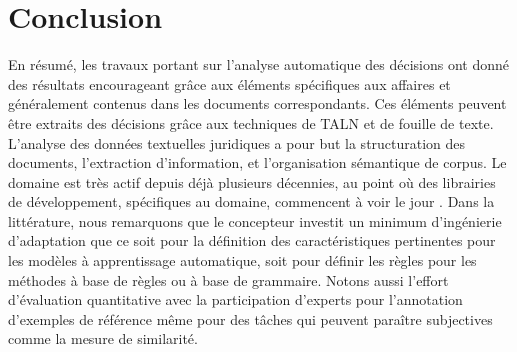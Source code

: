 \section{Conclusion}
\label{sec:literature:conclusion}
En résumé, les travaux portant sur l'analyse automatique des décisions ont donné des résultats encourageant grâce aux éléments spécifiques aux affaires et généralement contenus dans les documents correspondants. Ces éléments peuvent être extraits des décisions grâce aux techniques de TALN et de fouille de texte.  L'analyse des données textuelles juridiques a pour but la structuration des documents, l'extraction d'information, et l'organisation sémantique de corpus. Le domaine est très actif depuis déjà plusieurs décennies, au point où des librairies de développement, spécifiques au domaine, commencent à voir le jour \citep{bommarito2018lexnlp}. Dans la littérature, nous remarquons que le concepteur investit un minimum d'ingénierie d'adaptation que ce soit pour la définition des caractéristiques pertinentes pour les modèles à apprentissage automatique, soit pour définir les règles pour les méthodes à base de règles ou à base de grammaire. Notons aussi l'effort d'évaluation quantitative avec la participation d'experts pour l'annotation d'exemples de référence même pour des tâches qui peuvent paraître subjectives comme la mesure de similarité.



